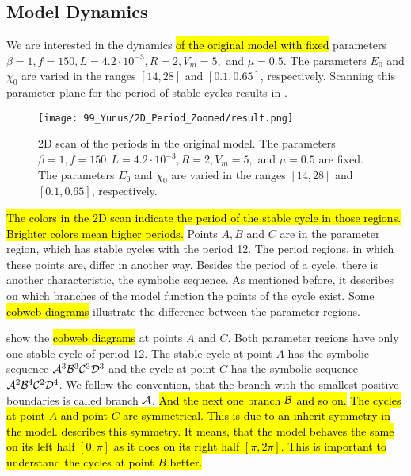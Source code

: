 \subsection{Model Dynamics}
\label{sec:state.og.dynamics}

We are interested in the dynamics \hl{of the original model with fixed} parameters $\beta = 1, f = 150, L = 4.2 \cdot 10^{-3}, R = 2, V_m = 5,$ and $\mu = 0.5$.
The parameters $E_0$ and $\chi_0$ are varied in the ranges $[14, 28]$ and $[0.1, 0.65]$, respectively.
Scanning this parameter plane for the period of stable cycles results in .

\begin{figure}
	\centering
	\texttt{[image: 99\_Yunus/2D\_Period\_Zoomed/result.png]}
	\caption[2D scan of the periods in the original model]{
		2D scan of the periods in the original model.
		The parameters $\beta = 1, f = 150, L = 4.2 \cdot 10^{-3}, R = 2, V_m = 5,$ and $\mu = 0.5$ are fixed.
		The parameters $E_0$ and $\chi_0$ are varied in the ranges $[14, 28]$ and $[0.1, 0.65]$, respectively.
	}
	\label{fig:setup.og.dynamics.period}
\end{figure}

\hl{
	The colors in the 2D scan  indicate the period of the stable cycle in those regions.
	Brighter colors mean higher periods.
}
Points $A, B$ and $C$ are in the parameter region, which has stable cycles with the period 12.
The period regions, in which these points are, differ in another way.
Besides the period of a cycle, there is another characteristic, the symbolic sequence.
As mentioned before, it describes on which branches of the model function the points of the cycle exist.
Some \hl{cobweb diagrams} illustrate the difference between the parameter regions.

 show the \hl{cobweb diagrams} at points $A$ and $C$.
Both parameter regions have only one stable cycle of period 12.
The stable cycle at point $A$ has the symbolic sequence $\mathcal{A}^3\mathcal{B}^3\mathcal{C}^3\mathcal{D}^3$ and the cycle at point $C$ has the symbolic sequence $\mathcal{A}^2\mathcal{B}^4\mathcal{C}^2\mathcal{D}^4$.
We follow the convention, that the branch with the smallest positive boundaries is called branch $\mathcal{A}$.
\hl{And the next one branch $\mathcal{B}$ and so on.}
\hl{
	The cycles at point $A$ and point $C$ are symmetrical.
	This is due to an inherit symmetry in the model.
	 describes this symmetry.
	It means, that the model behaves the same on its left half $[0, \pi]$ as it does on its right half $[\pi, 2\pi]$.
	This is important to understand the cycles at point $B$ better.
}

